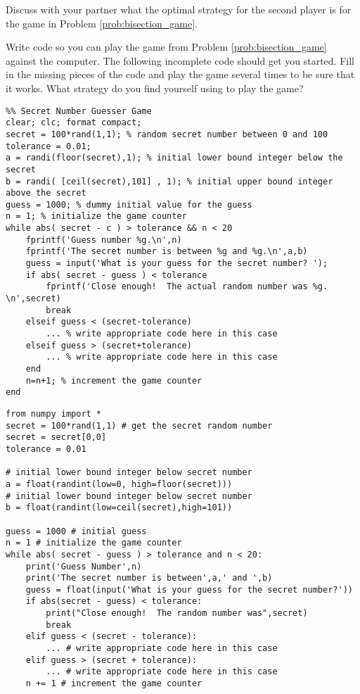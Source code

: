 \begin{problem}
    Discuss with your partner what the optimal strategy for the second player is for the
    game in Problem \ref{prob:bisection_game}.
\end{problem}

\begin{problem}
    Write \ProgLang code so you can play the game from Problem
    \ref{prob:bisection_game} against the computer.  
    The following incomplete code should get you started.  Fill in the missing pieces of
    the code and play the game several times to be sure that it works.  What strategy do
    you find yourself using to play the game? 
    \ifnum{}
\begin{lstlisting}
%% Secret Number Guesser Game
clear; clc; format compact;
secret = 100*rand(1,1); % random secret number between 0 and 100
tolerance = 0.01;
a = randi(floor(secret),1); % initial lower bound integer below the secret
b = randi( [ceil(secret),101] , 1); % initial upper bound integer above the secret
guess = 1000; % dummy initial value for the guess
n = 1; % initialize the game counter
while abs( secret - c ) > tolerance && n < 20
    fprintf('Guess number %g.\n',n)
    fprintf('The secret number is between %g and %g.\n',a,b)
    guess = input('What is your guess for the secret number? ');
    if abs( secret - guess ) < tolerance
        fprintf('Close enough!  The actual random number was %g. \n',secret) 
        break
    elseif guess < (secret-tolerance)
        ... % write appropriate code here in this case
    elseif guess > (secret+tolerance)
        ... % write appropriate code here in this case
    end
    n=n+1; % increment the game counter
end
\end{lstlisting}
\else
\begin{lstlisting}
from numpy import *
secret = 100*rand(1,1) # get the secret random number
secret = secret[0,0]
tolerance = 0.01

# initial lower bound integer below secret number
a = float(randint(low=0, high=floor(secret))) 
# initial lower bound integer below secret number
b = float(randint(low=ceil(secret),high=101))

guess = 1000 # initial guess
n = 1 # initialize the game counter
while abs( secret - guess ) > tolerance and n < 20:
    print('Guess Number',n)
    print('The secret number is between',a,' and ',b)
    guess = float(input('What is your guess for the secret number?'))
    if abs(secret - guess) < tolerance:
        print("Close enough!  The random number was",secret)
        break
    elif guess < (secret - tolerance):
        ... # write appropriate code here in this case
    elif guess > (secret + tolerance):
        ... # write appropriate code here in this case
    n += 1 # increment the game counter
\end{lstlisting}
\fi
\end{problem}



